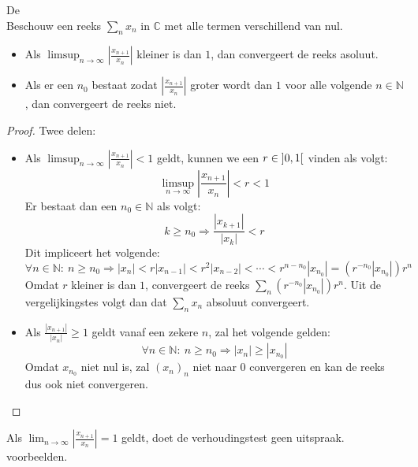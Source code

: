 \documentclass[main.tex]{subfiles}
\begin{document}
\begin{st}
  \label{st:verhoudingstest-dalembert}
  De \\
  Beschouw een reeks $\sum_{n}x_{n}$ in $\mathbb{C}$ met alle termen verschillend van nul.
  \begin{itemize}
  \item Als $\limsup_{n\rightarrow \infty}\left| \frac{x_{n+1}}{x_{n}}\right|$ kleiner is dan $1$, dan convergeert de reeks asoluut.
  \item Als er een $n_{0}$ bestaat zodat $\left| \frac{x_{n+1}}{x_{n}}\right|$ groter wordt dan $1$ voor alle volgende $n\in \mathbb{N}$, dan convergeert de reeks niet.
  \end{itemize}

  \begin{proof}
    Twee delen:
    \begin{itemize}
    \item Als $\limsup_{n\rightarrow \infty}\left| \frac{x_{n+1}}{x_{n}}\right| < 1$ geldt, kunnen we een $r\in \interval[open]{0}{1}$ vinden als volgt:
      \[ \limsup_{n\rightarrow \infty}\left| \frac{x_{n+1}}{x_{n}}\right| < r < 1 \]
      Er bestaat dan een $n_{0}\in \mathbb{N}$ als volgt:\waarom
      \[ k \ge n_{0} \Rightarrow \frac{|x_{k+1}|}{|x_{k}|} < r \]
      Dit impliceert het volgende:
      \[ \forall n\in \mathbb{N}:\ n \ge n_{0} \Rightarrow |x_{n}| < r|x_{n-1}| < r^{2}|x_{n-2}| < \dotsb < r^{n-n_{0}}|x_{n_{0}}| = (r^{-n_{0}}|x_{n_{0}}|)r^{n} \]
      Omdat $r$ kleiner is dan $1$, convergeert de reeks $\sum_{n}(r^{-n_{0}}|x_{n_{0}}|)r^{n}$.
      Uit de vergelijkingstes volgt dan dat $\sum_{n}x_{n}$ absoluut convergeert.
    \item Als $\frac{|x_{n+1}|}{|x_{n}|} \ge 1$ geldt vanaf een zekere $n$, zal het volgende gelden:
      \[ \forall n\in \mathbb{N}:\ n \ge n_{0} \Rightarrow |x_{n}| \ge |x_{n_{0}}| \]
      Omdat $x_{n_{0}}$ niet nul is, zal $(x_{n})_{n}$ niet naar $0$ convergeren en kan de reeks dus ook niet convergeren.
    \end{itemize}
  \end{proof}
\end{st}

\begin{opm}
  Als $\lim_{n\rightarrow \infty}\left|\frac{x_{n+1}}{x_{n}}\right| = 1$ geldt, doet de verhoudingstest geen uitspraak.
 voorbeelden.
\end{opm}
\end{document}

